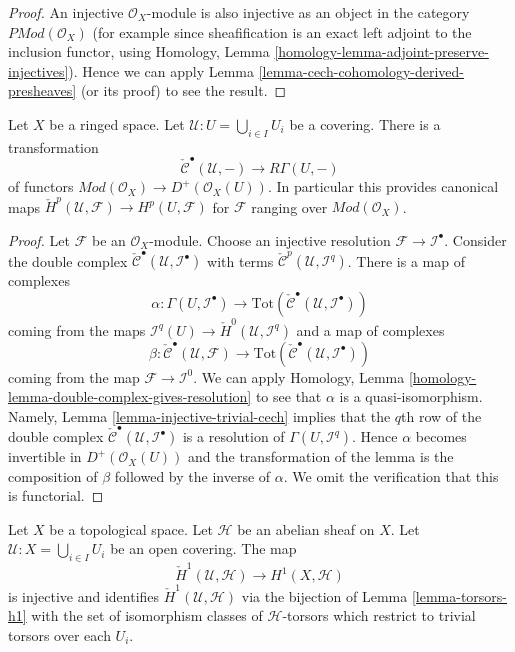\begin{proof}
An injective $\mathcal{O}_X$-module is also injective as an object in
the category $\textit{PMod}(\mathcal{O}_X)$ (for example since
sheafification is an exact left adjoint to the inclusion functor,
using Homology, Lemma \ref{homology-lemma-adjoint-preserve-injectives}).
Hence we can apply Lemma \ref{lemma-cech-cohomology-derived-presheaves}
(or its proof) to see the result.
\end{proof}

\begin{lemma}
\label{lemma-cech-cohomology}
Let $X$ be a ringed space.
Let $\mathcal{U} : U = \bigcup_{i \in I} U_i$ be a covering.
There is a transformation
$$
\check{\mathcal{C}}^\bullet(\mathcal{U}, -)
\longrightarrow
R\Gamma(U, -)
$$
of functors
$\textit{Mod}(\mathcal{O}_X) \to D^{+}(\mathcal{O}_X(U))$.
In particular this provides canonical maps
$\check{H}^p(\mathcal{U}, \mathcal{F}) \to H^p(U, \mathcal{F})$ for
$\mathcal{F}$ ranging over $\textit{Mod}(\mathcal{O}_X)$.
\end{lemma}

\begin{proof}
Let $\mathcal{F}$ be an $\mathcal{O}_X$-module. Choose an injective resolution
$\mathcal{F} \to \mathcal{I}^\bullet$. Consider the double complex
$\check{\mathcal{C}}^\bullet(\mathcal{U}, \mathcal{I}^\bullet)$ with terms
$\check{\mathcal{C}}^p(\mathcal{U}, \mathcal{I}^q)$.
There is a map of complexes
$$
\alpha :
\Gamma(U, \mathcal{I}^\bullet)
\longrightarrow
\text{Tot}(\check{\mathcal{C}}^\bullet(\mathcal{U}, \mathcal{I}^\bullet))
$$
coming from the maps
$\mathcal{I}^q(U) \to \check{H}^0(\mathcal{U}, \mathcal{I}^q)$
and a map of complexes
$$
\beta :
\check{\mathcal{C}}^\bullet(\mathcal{U}, \mathcal{F})
\longrightarrow
\text{Tot}(\check{\mathcal{C}}^\bullet(\mathcal{U}, \mathcal{I}^\bullet))
$$
coming from the map $\mathcal{F} \to \mathcal{I}^0$.
We can apply
Homology, Lemma \ref{homology-lemma-double-complex-gives-resolution}
to see that $\alpha$ is a quasi-isomorphism.
Namely, Lemma \ref{lemma-injective-trivial-cech} implies that
the $q$th row of the double complex
$\check{\mathcal{C}}^\bullet(\mathcal{U}, \mathcal{I}^\bullet)$ is a
resolution of $\Gamma(U, \mathcal{I}^q)$.
Hence $\alpha$ becomes invertible in $D^{+}(\mathcal{O}_X(U))$ and
the transformation of the lemma is the composition of $\beta$
followed by the inverse of $\alpha$. We omit the verification
that this is functorial.
\end{proof}

\begin{lemma}
\label{lemma-cech-h1}
Let $X$ be a topological space. Let $\mathcal{H}$ be an abelian sheaf
on $X$. Let $\mathcal{U} : X = \bigcup_{i \in I} U_i$ be an open covering.
The map
$$
\check{H}^1(\mathcal{U}, \mathcal{H}) \longrightarrow H^1(X, \mathcal{H})
$$
is injective and identifies $\check{H}^1(\mathcal{U}, \mathcal{H})$ via
the bijection of Lemma \ref{lemma-torsors-h1}
with the set of isomorphism classes of $\mathcal{H}$-torsors
which restrict to trivial torsors over each $U_i$.
\end{lemma}

